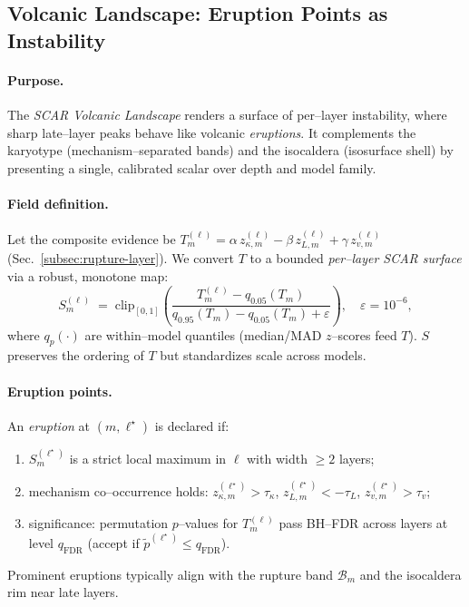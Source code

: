 \documentclass[11pt]{article}
\begin{document}
\vspace{0.5em}
\subsection{Volcanic Landscape: Eruption Points as Instability}
\label{subsec:volcano}

\paragraph{Purpose.}
The \emph{SCAR Volcanic Landscape} renders a surface of per–layer instability, where sharp late–layer peaks behave like volcanic \emph{eruptions}. It complements the karyotype (mechanism–separated bands) and the isocaldera (isosurface shell) by presenting a single, calibrated scalar over depth and model family.

\paragraph{Field definition.}
Let the composite evidence be $T_m^{(\ell)}=\alpha\,z_{\kappa,m}^{(\ell)}-\beta\,z_{L,m}^{(\ell)}+\gamma\,z_{v,m}^{(\ell)}$ (Sec.~\ref{subsec:rupture-layer}). We convert $T$ to a bounded \emph{per–layer SCAR surface} via a robust, monotone map:
\[
S_m^{(\ell)} \;=\; \mathrm{clip}_{[0,1]}\!\left(\frac{T_m^{(\ell)}-q_{0.05}(T_m)}{q_{0.95}(T_m)-q_{0.05}(T_m)+\varepsilon}\right),
\quad \varepsilon=10^{-6},
\]
where $q_{p}(\cdot)$ are within–model quantiles (median/MAD $z$–scores feed $T$). $S$ preserves the ordering of $T$ but standardizes scale across models.

\paragraph{Eruption points.}
An \emph{eruption} at $(m,\ell^\star)$ is declared if:
\begin{enumerate}
\item $S_m^{(\ell^\star)}$ is a strict local maximum in $\ell$ with width $\ge 2$ layers;
\item mechanism co–occurrence holds: $z_{\kappa,m}^{(\ell^\star)}>\tau_\kappa$, $z_{L,m}^{(\ell^\star)}<-\tau_L$, $z_{v,m}^{(\ell^\star)}>\tau_v$;
\item significance: permutation $p$–values for $T_m^{(\ell)}$ pass BH–FDR across layers at level $q_{\mathrm{FDR}}$ (accept if $\tilde p^{(\ell^\star)}\le q_{\mathrm{FDR}}$).
\end{enumerate}
Prominent eruptions typically align with the rupture band $\mathcal{B}_m$ and the isocaldera rim near late layers.
\end{document}
